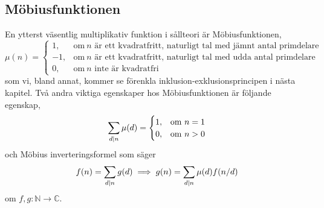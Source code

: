 \subsection{Möbiusfunktionen} \label{Mobius}
En ytterst väsentlig multiplikativ funktion i sållteori är Möbiusfunktionen,
\begin{equation*}
    \mu(n) = 
    \begin{cases}
        1, & \text{om}\ n \text{ är ett kvadratfritt, naturligt tal med jämnt antal primdelare}\\
        -1, & \text{om}\ n \text{ är ett kvadratfritt, naturligt tal med udda antal primdelare}\\
        0, & \text{om}\ n \text{ inte är kvadratfri}
    \end{cases}
\end{equation*}
som vi, bland annat, kommer se förenkla inklusion-exklusionsprincipen i nästa kapitel. Två andra viktiga egenskaper hos Möbiusfunktionen är följande egenskap,
\begin{equation*}
    \sum_{d \mid n} \mu(d) =
    \begin{cases}
        1, & \text{om}\ n = 1 \\
        0, & \text{om}\ n > 0
    \end{cases}
\end{equation*}
och Möbius inverteringsformel som säger
\begin{equation} \label{mobiusinv}
    f(n) = \sum_{d \mid n} g(d) \implies g(n) = \sum_{d \mid n} \mu(d) f(n/d)
\end{equation}
om \(f, g : \mathbb{N} \to \mathbb{C}\).



